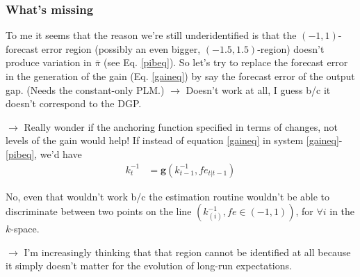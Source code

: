\documentclass[11pt]{article}
\renewcommand{\[}{\begin{equation}}
\renewcommand{\]}{\end{equation}}
\begin{document}
\subsubsection*{What's missing}
To me it seems that the reason we're still underidentified is that the $(-1,1)$-forecast error region (possibly an even bigger, $(-1.5, 1.5)$-region) doesn't produce variation in $\bar{\pi}$ (see Eq. \ref{pibeq}). So let's try to replace the forecast error in the generation of the gain (Eq. \ref{gaineq}) by say the forecast error of the output gap. (Needs the constant-only PLM.) $\rightarrow$ Doesn't work at all, I guess b/c it doesn't correspond to the DGP.

$\rightarrow$ Really wonder if the anchoring function specified in terms of changes, not levels of the gain would help! If instead of equation \ref{gaineq} in system \ref{gaineq}-\ref{pibeq}, we'd have
\begin{align}
k_t^{-1} &= \mathbf{g}(k_{t-1}^{-1},fe_{t|t-1}) \label{gaineqchanges}
\end{align}

No, even that wouldn't work b/c the estimation routine wouldn't be able to discriminate between two points on the line $(k^{-1}_{(i)}, fe \in (-1,1))$, for $\forall i$ in the $k$-space.

$\rightarrow$ I'm increasingly thinking that that region cannot be identified at all because it simply doesn't matter for the evolution of long-run expectations.
\end{document}
